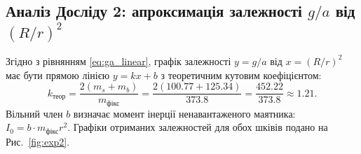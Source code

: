 \documentclass[ukrainian]{ucaphyslab}
\begin{document}
\subsection{Аналіз Досліду 2: апроксимація залежності $g/a$ від $(R/r)^2$}
Згідно з рівнянням \eqref{eq:ga_linear}, графік залежності $y = g/a$ від $x = (R/r)^2$ має бути прямою лінією $y = k x + b$ з теоретичним кутовим коефіцієнтом:
\begin{equation}
  k_{\text{теор}} = \frac{2(m_s + m_b)}{m_{\text{фікс}}} = \frac{2(\num{100.77} + \num{125.34})}{\num{373.8}} = \frac{\num{452.22}}{\num{373.8}} \approx \num{1.21}.
  \label{eq:k_theor}
\end{equation}
Вільний член $b$ визначає момент інерції ненавантаженого маятника: $I_0 = b \cdot m_{\text{фікс}} r^2$. Графіки отриманих залежностей для обох шківів подано на Рис.~\ref{fig:exp2}.
\end{document}
